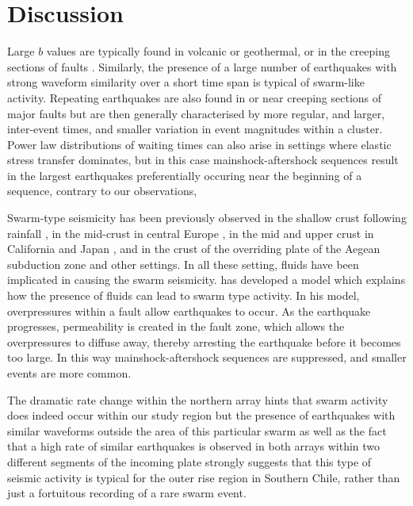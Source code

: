 \documentclass[reviewcopy]{elsarticle}
\begin{document}
\section{Discussion}

Large $b$ values are typically found in volcanic or geothermal, or in
the creeping sections of faults \citep{wiemer02}.
Similarly, the presence of a large number of earthquakes with strong
waveform similarity over a short time span is typical of
swarm-like activity.  Repeating earthquakes are also found in or near creeping
sections of major faults \citep[e.g.][]{nadeau98} but are then
generally characterised by more regular, and larger, inter-event
times, and smaller variation in event magnitudes within a
cluster. Power law distributions of waiting times can also
arise in settings where elastic stress transfer dominates, but in this
case mainshock-aftershock sequences result in the largest earthquakes
preferentially occuring near the beginning of a sequence, contrary to
our observations,

Swarm-type seismicity has been
previously observed in the shallow crust following rainfall
\citep{kraft06}, in the mid-crust in central Europe \citep{kurz04}, in
the mid and upper crust in California and Japan \citep{vidale06}, and
in the crust of the overriding plate of the Aegean subduction zone
\citep{becker06} and other settings.  In all these setting, fluids
have been implicated in causing the swarm seismicity.   \citet{yamashita99} has developed a model which
explains how the presence of fluids can lead to swarm type activity.
In his model, overpressures within a fault allow earthquakes to
occur.  As the earthquake progresses, permeability is created in the
fault zone, which allows the overpressures to diffuse away, thereby
arresting the earthquake before it becomes too large.  In this way
mainshock-aftershock sequences are suppressed, and smaller events are
more common.

The dramatic rate change within the northern array hints that swarm
activity does indeed occur within our study region but the presence of
 earthquakes with similar waveforms outside the area of this particular swarm as well
as the fact that a high rate of similar earthquakes is observed in
both arrays within two different segments of the incoming plate
strongly suggests that this type of seismic activity is typical for
the outer rise region in Southern Chile, rather than just a fortuitous
recording of a rare swarm event.
\end{document}
